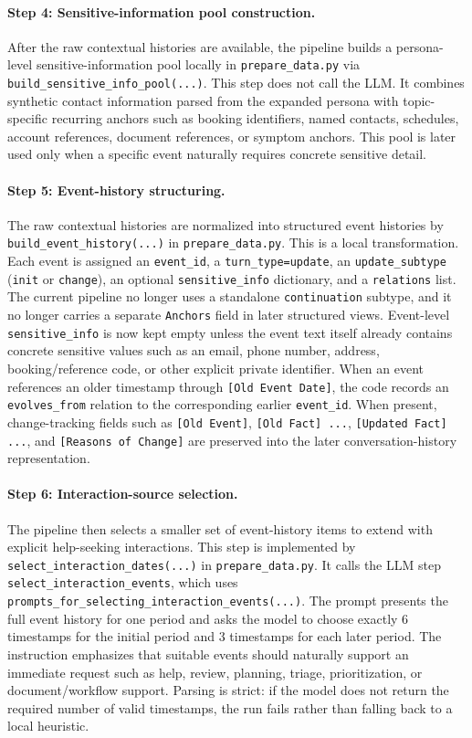 \paragraph{Step 4: Sensitive-information pool construction.}
After the raw contextual histories are available, the pipeline builds a persona-level sensitive-information pool locally in \texttt{prepare\_data.py} via \texttt{build\_sensitive\_info\_pool(...)}. This step does not call the LLM. It combines synthetic contact information parsed from the expanded persona with topic-specific recurring anchors such as booking identifiers, named contacts, schedules, account references, document references, or symptom anchors. This pool is later used only when a specific event naturally requires concrete sensitive detail.

\paragraph{Step 5: Event-history structuring.}
The raw contextual histories are normalized into structured event histories by \texttt{build\_event\_history(...)} in \texttt{prepare\_data.py}. This is a local transformation. Each event is assigned an \texttt{event\_id}, a \texttt{turn\_type=update}, an \texttt{update\_subtype} (\texttt{init} or \texttt{change}), an optional \texttt{sensitive\_info} dictionary, and a \texttt{relations} list. The current pipeline no longer uses a standalone \texttt{continuation} subtype, and it no longer carries a separate \texttt{Anchors} field in later structured views. Event-level \texttt{sensitive\_info} is now kept empty unless the event text itself already contains concrete sensitive values such as an email, phone number, address, booking/reference code, or other explicit private identifier. When an event references an older timestamp through \texttt{[Old Event Date]}, the code records an \texttt{evolves\_from} relation to the corresponding earlier \texttt{event\_id}. When present, change-tracking fields such as \texttt{[Old Event]}, \texttt{[Old Fact] ...}, \texttt{[Updated Fact] ...}, and \texttt{[Reasons of Change]} are preserved into the later conversation-history representation.

\paragraph{Step 6: Interaction-source selection.}
The pipeline then selects a smaller set of event-history items to extend with explicit help-seeking interactions. This step is implemented by \texttt{select\_interaction\_dates(...)} in \texttt{prepare\_data.py}. It calls the LLM step \texttt{select\_interaction\_events}, which uses \texttt{prompts\_for\_selecting\_interaction\_events(...)}. The prompt presents the full event history for one period and asks the model to choose exactly 6 timestamps for the initial period and 3 timestamps for each later period. The instruction emphasizes that suitable events should naturally support an immediate request such as help, review, planning, triage, prioritization, or document/workflow support. Parsing is strict: if the model does not return the required number of valid timestamps, the run fails rather than falling back to a local heuristic.


